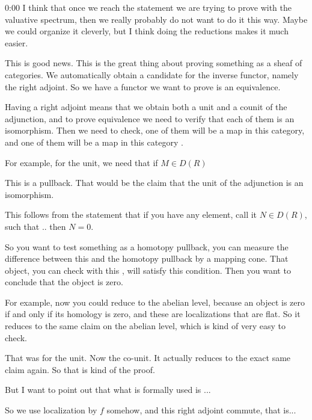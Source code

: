 \begin{unfinished}{0:00}
\ans I think that once we reach the statement we are trying to prove with the valuative spectrum, then we really probably do not want to do it this way. Maybe we could organize it cleverly, but I think doing the reductions makes it much easier.

This is good news. This is the great thing about proving something as a sheaf of categories. We automatically obtain a candidate for the inverse functor, namely the right adjoint. So we have a functor we want to prove is an equivalence. 

Having a right adjoint means that we obtain both a unit and a counit of the adjunction, and to prove equivalence we need to verify that each of them is an isomorphism. Then we need to check, one of them will be a map in this category, and one of them will be a map in this category .

\begin{example}
For example, for the unit, we need that if $M \in D(R)$


This is a pullback. That would be the claim that the unit of the adjunction is an isomorphism.

This follows from the statement that if you have any element, call it $N \in D(R)$, such that ..  then $N = 0$.

So you want to test something as a homotopy pullback, you can measure the difference between this  and the homotopy pullback by a mapping cone. That object, you can check with this , will satisfy this condition. Then you want to conclude that the object is zero. 

For example, now you could reduce to the abelian level, because an object is zero if and only if its homology is zero, and these are localizations that are flat. So it reduces to the same claim on the abelian level, which is kind of very easy to check. 

That was for the unit. Now the co-unit.
It actually reduces to the exact same claim again. So that is kind of the proof. 

But I want to point out that what is formally used is ...

\gabber So we use localization by $f$ somehow, and this right adjoint commute, that is...

\end{example}


\end{unfinished}
